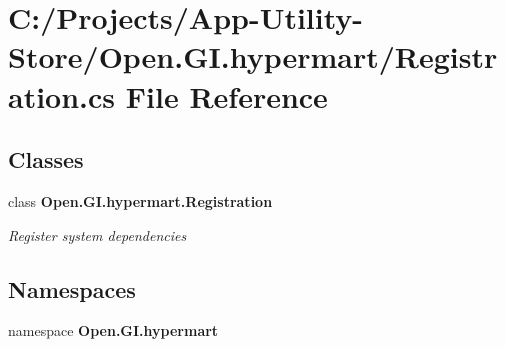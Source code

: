 \section{C\+:/\+Projects/\+App-\/\+Utility-\/\+Store/\+Open.G\+I.\+hypermart/\+Registration.cs File Reference}
\label{_registration_8cs}
\subsection*{Classes}
\begin{DoxyCompactItemize}
\item 
class {\bfseries Open.\+G\+I.\+hypermart.\+Registration}
\begin{DoxyCompactList}\small\item\em Register system dependencies \end{DoxyCompactList}\end{DoxyCompactItemize}
\subsection*{Namespaces}
\begin{DoxyCompactItemize}
\item 
namespace \textbf{ Open.\+G\+I.\+hypermart}
\end{DoxyCompactItemize}
